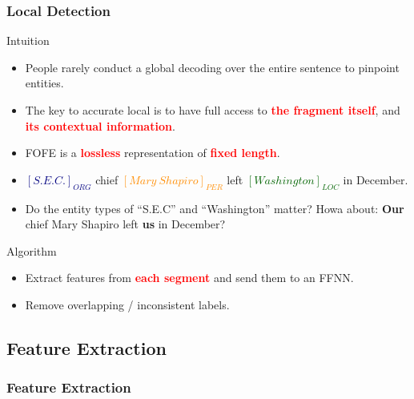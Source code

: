 \documentclass{beamer}
\begin{document}
\begin{frame}
\frametitle{Local Detection}
\begin{block}{Intuition}
	\begin{itemize}
	\item People rarely conduct a global decoding over the entire sentence to pinpoint entities.
	\item The key to accurate local is to have full access to
		\textbf{\textcolor{red}{the fragment itself}}, and
		\textbf{\textcolor{red}{its contextual information}}.
	\item FOFE is a \textbf{\textcolor{red}{lossless}} representation of \textbf{\textcolor{red}{fixed length}}.
	\end{itemize}
\end{block}
\begin{example}
    \begin{itemize}
    \item \textbf{\textcolor{navy}{$[S.E.C.]_{ORG}$}} chief 
            \textbf{\textcolor{darkorange}{$[Mary\ Shapiro]_{PER}$}} left 
            \textbf{\textcolor{darkgreen}{$[Washington]_{LOC}$}} in December. \\
    \item Do the entity types of ``S.E.C'' and ``Washington'' matter? Howa about:
    \textbf{Our} chief Mary Shapiro left \textbf{us} in December?
    \end{itemize}
\end{example}
\end{frame}
\begin{frame}
\begin{block}{Algorithm}
	\begin{itemize}
	\item Extract features from \textbf{\textcolor{red}{each segment}} and send them to an FFNN.
	\item Remove overlapping / inconsistent labels.
	\end{itemize}
\end{block}
\end{frame}


\subsection{Feature Extraction}

\begin{frame}
\frametitle{Feature Extraction}
\end{frame}
\end{document}

